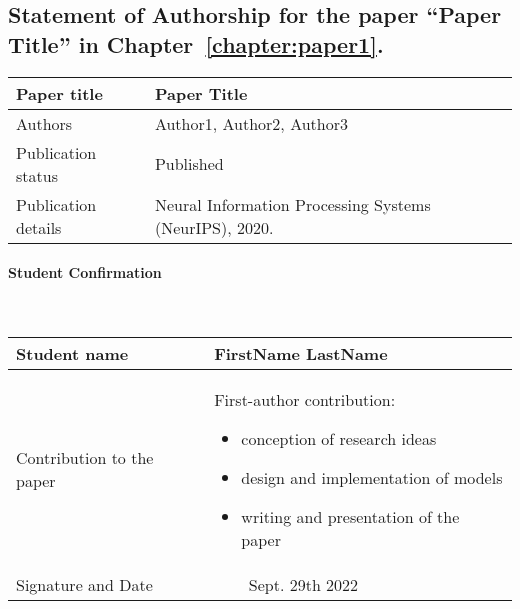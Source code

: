 \subsection*{Statement of Authorship for the paper
{\color{tcolor} ``Paper Title''}
in Chapter~\ref{chapter:paper1}.
}

\begin{table*}[h]
    \centering
    \small
    \begin{tabular}{| p{} | p{} |}
        \hline
        Paper title & Paper Title \\ \hline
        Authors & Author1, Author2, Author3 \\ \hline
        Publication status & Published \\ \hline
        Publication details &
            Neural Information Processing Systems (NeurIPS), 2020. \\ \hline
    \end{tabular}
\end{table*}

\paragraph{{\color{tcolor} Student Confirmation}} \mbox{}\\

\begin{table*}[h]
    \centering
    \small
    \begin{tabular}{| p{} | p{} | p{} |}
        \hline
        Student name & \multicolumn{2}{p{0.6\textwidth}|}{FirstName LastName} \\ \hline
        Contribution to the paper & 
            \multicolumn{2}{p{0.6\textwidth}|}{
            First-author contribution:
            \begin{itemize}[itemsep=-5pt]
                \vspace{-3mm}
                \item conception of research ideas
                \item design and implementation of models
                \item writing and presentation of the paper
                \vspace{-3mm}
            \end{itemize}
            }\\ \hline
        Signature and Date & & Sept. 29th 2022 \\ \hline
    \end{tabular}
\end{table*}

